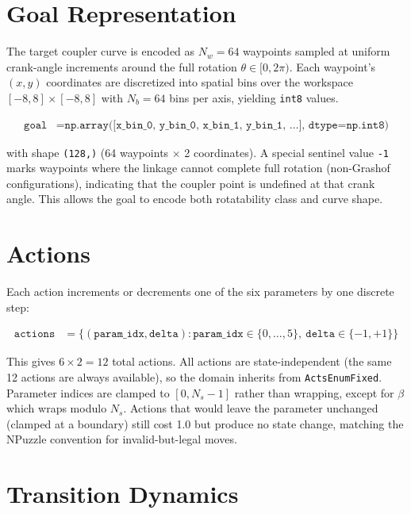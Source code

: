 \documentclass[11pt]{article}
\begin{document}
\section{Goal Representation}

The target coupler curve is encoded as $N_w = 64$ waypoints sampled at uniform crank-angle increments around the full rotation $\theta \in [0, 2\pi)$. Each waypoint's $(x, y)$ coordinates are discretized into spatial bins over the workspace $[-8, 8] \times [-8, 8]$ with $N_b = 64$ bins per axis, yielding \texttt{int8} values.

\begin{align}
    \texttt{goal} &= \texttt{np.array([x\_bin\_0, y\_bin\_0, x\_bin\_1, y\_bin\_1, \ldots], dtype=np.int8)}
\end{align}

with shape \texttt{(128,)} (64 waypoints $\times$ 2 coordinates). A special sentinel value \texttt{-1} marks waypoints where the linkage cannot complete full rotation (non-Grashof configurations), indicating that the coupler point is undefined at that crank angle. This allows the goal to encode both rotatability class and curve shape.

\section{Actions}

Each action increments or decrements one of the six parameters by one discrete step:

\begin{align}
    \texttt{actions} &= \{(\texttt{param\_idx}, \texttt{delta}) : \texttt{param\_idx} \in \{0,\ldots,5\},\ \texttt{delta} \in \{-1, +1\}\}
\end{align}

This gives $6 \times 2 = 12$ total actions. All actions are state-independent (the same 12 actions are always available), so the domain inherits from \texttt{ActsEnumFixed}. Parameter indices are clamped to $[0, N_s - 1]$ rather than wrapping, except for $\beta$ which wraps modulo $N_s$. Actions that would leave the parameter unchanged (clamped at a boundary) still cost 1.0 but produce no state change, matching the NPuzzle convention for invalid-but-legal moves.

\section{Transition Dynamics}
\end{document}
